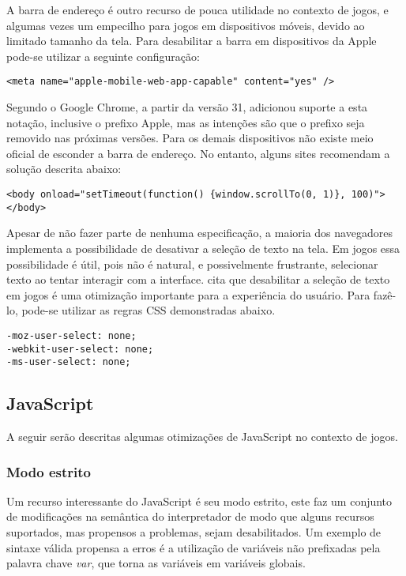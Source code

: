 A barra de endereço é outro recurso de pouca utilidade no contexto
de jogos, e algumas vezes um empecilho para jogos em dispositivos
móveis, devido ao limitado tamanho da tela. Para desabilitar a barra em
dispositivos da Apple pode-se utilizar a seguinte configuração:

\begin{verbatim}
<meta name="apple-mobile-web-app-capable" content="yes" />
\end{verbatim}

Segundo \citet{homescreenwebapps} o Google Chrome, a partir da versão
31, adicionou suporte a esta notação, inclusive o prefixo Apple, mas
as intenções são que o prefixo seja removido nas próximas versões.
Para os demais dispositivos não existe meio oficial de esconder a
barra de endereço. No entanto, alguns sites recomendam a solução
descrita abaixo:

\begin{verbatim}
<body onload="setTimeout(function() {window.scrollTo(0, 1)}, 100)">
</body>
\end{verbatim}

Apesar de não fazer parte de nenhuma especificação, a maioria dos
navegadores implementa a possibilidade de desativar a seleção de texto
na tela. Em jogos essa possibilidade é útil, pois não é natural, e
possivelmente frustrante, selecionar texto ao tentar interagir com a
interface. \citet{html5mostwanted} cita que desabilitar a seleção de
texto em jogos é uma otimização importante para a experiência do
usuário. Para fazê-lo, pode-se utilizar as regras CSS demonstradas
abaixo.

\begin{verbatim}
-moz-user-select: none;
-webkit-user-select: none;
-ms-user-select: none;
\end{verbatim}

\subsection{JavaScript}

A seguir serão descritas algumas otimizações de JavaScript no
contexto de jogos.

\subsubsection{Modo estrito}

Um recurso interessante do JavaScript é seu modo estrito, este faz
um conjunto de modificações na semântica do interpretador de modo
que alguns recursos suportados, mas propensos a problemas, sejam
desabilitados. Um exemplo de sintaxe válida propensa a erros é a
utilização de variáveis não prefixadas pela palavra chave \textit{var},
que torna as variáveis em variáveis globais.

